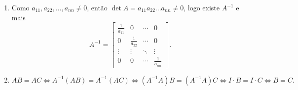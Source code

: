 \documentclass{report}
\begin{document}
\begin{enumerate}



\item Como $a_{11},a_{22},\dots,a_{nn}\neq 0$, então $\det A =
a_{11}a_{22}...a_{nn}\neq 0$,  logo existe $A^{-1}$ e mais
$$A^{-1}=\left[
\begin{array}{cccc}
\frac{1}{a_{11}} & 0 & \cdots  & 0 \\
0 & \frac{1}{a_{22}} & \cdots  & 0 \\
\vdots  & \vdots  & \ddots  & \vdots  \\
0 & 0 & \cdots  & \frac{1}{a_{nn}}
\end{array}
\right].$$






\item $AB=AC \Leftrightarrow A^{-1}(AB)=A^{-1}(AC)\Leftrightarrow
(A^{-1}A)B=(A^{-1}A)C\Leftrightarrow I \cdot B = I \cdot C
\Leftrightarrow B=C.$



\end{enumerate}
\end{document}
